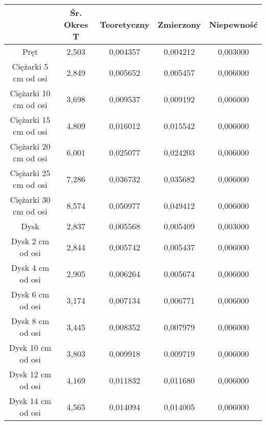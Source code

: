 \documentclass[10pt,a4paper]{article}
\begin{document}
\begin{center}
\begin{tabular}{|c|c|c|c|c|}
\hline	
 & Śr. Okres T & Teoretyczny & Zmierzony & Niepewność\\
\hline
Pręt & 2,503 & 0,004357 & 0,004212 & 0,003000\\
\hline
Ciężarki 5 cm od osi & 2,849&0,005652&	0,005457&	0,006000\\
\hline
Ciężarki 10 cm od osi&3,698	&0,009537&	0,009192&	0,006000\\
\hline
Ciężarki 15 cm od osi&4,809 &0,016012&	0,015542&	0,006000\\
\hline
Ciężarki 20 cm od osi&6,001 &0,025077&	0,024203&	0,006000\\
\hline
Ciężarki 25 cm od osi&7,286 &0,036732&	0,035682&	0,006000\\
\hline
Ciężarki 30 cm od osi&8,574	&0,050977&	0,049412&	0,006000\\
\hline
Dysk&2,837&0,005568&	0,005409&	0,003000\\
\hline
Dysk 2 cm od osi&2,844&0,005742&	0,005437&	0,006000\\
\hline
Dysk 4 cm od osi&2,905&0,006264&	0,005674&	0,006000\\
\hline
Dysk 6 cm od osi&3,174&0,007134&	0,006771&	0,006000\\
\hline
Dysk 8 cm od osi&3,445&0,008352&	0,007979&	0,006000\\
\hline
Dysk 10 cm od osi&3,803&0,009918&	0,009719&	0,006000\\
\hline
Dysk 12 cm od osi&4,169&0,011832&	0,011680&	0,006000\\
\hline
Dysk 14 cm od osi&4,565&0,014094&	0,014005&	0,006000\\
\hline


\end{tabular}
\end{center}
\end{document}

